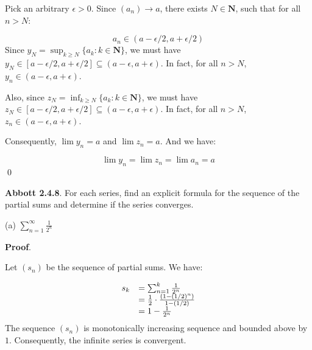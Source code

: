 \documentclass[10pt]{article}
\begin{document}
Pick an arbitrary $\displaystyle \epsilon  >0$. Since $\displaystyle ( a_{n})\rightarrow a$, there exists $\displaystyle N\in \mathbf{N}$, such that for all $\displaystyle n >N$:


\begin{equation*}
a_{n} \in ( a-\epsilon /2,a+\epsilon /2)
\end{equation*}
Since $\displaystyle y_{N} =\sup _{k\geq N}\{a_{k} :k\in \mathbf{N}\}$, we must have $\displaystyle y_{N} \in [ a-\epsilon /2,a+\epsilon /2] \subseteq ( a-\epsilon ,a+\epsilon )$. In fact, for all $\displaystyle n >N$, $\displaystyle y_{n} \in ( a-\epsilon ,a+\epsilon )$.



Also, since $\displaystyle z_{N} =\inf_{k\geq N}\{a_{k} :k\in \mathbf{N}\}$, we must have $\displaystyle z_{N} \in [ a-\epsilon /2,a+\epsilon /2] \subseteq ( a-\epsilon ,a+\epsilon )$. In fact, for all $\displaystyle n >N$, $\displaystyle z_{n} \in ( a-\epsilon ,a+\epsilon )$.



Consequently, $\displaystyle \lim y_{n} =a$ and $\displaystyle \lim z_{n} =a$. And we have:


\begin{equation*}
\lim y_{n} =\lim z_{n} =\lim a_{n} =a
\end{equation*}
\qed 



\textbf{Abbott 2.4.8}. For each series, find an explicit formula for the sequence of the partial sums and determine if the series converges. 



(a) $\displaystyle \sum _{n=1}^{\infty }\frac{1}{2^{n}}$ 



\textbf{Proof}.

Let $\displaystyle ( s_{n})$ be the sequence of partial sums. We have:




\begin{equation*}
\begin{array}{ c l }
s_{k} & =\sum _{n=1}^{k}\frac{1}{2^{n}}\\
 & =\frac{1}{2} \cdot \frac{\left( 1-( 1/2)^{n}\right)}{1-( 1/2)}\\
 & =1-\frac{1}{2^{n}}
\end{array}
\end{equation*}
The sequence $\displaystyle ( s_{n})$ is monotonically increasing sequence and bounded above by $\displaystyle 1$. Consequently, the infinite series is convergent.
\end{document}
